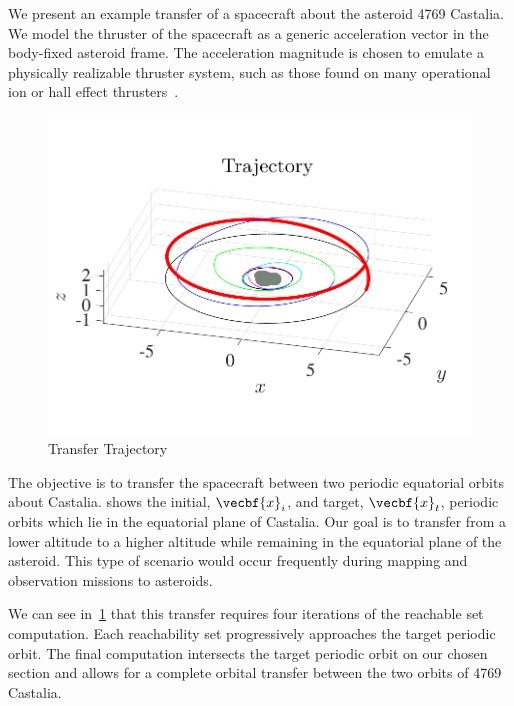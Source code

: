 \documentclass[11pt,reqno]{amsart} %
\begin{document}
\begin{multicols}{2}
We present an example transfer of a spacecraft about the asteroid 4769 Castalia.  
We model the thruster of the spacecraft as a generic acceleration vector in the body-fixed asteroid frame. 
The acceleration magnitude is chosen to emulate a physically realizable thruster system, such as those found on many operational ion or hall effect thrusters~\cite{goebel2008,choueiri2009}.
\begin{figure}[H]
    \includegraphics[width=0.5\columnwidth,height=\columnwidth,keepaspectratio]{figures/trajectory_3d.pdf} 
    \caption{Transfer Trajectory}
    \label{fig:transfer_3d} 
\end{figure}

The objective is to transfer the spacecraft between two periodic equatorial orbits about Castalia.
 shows the initial, \( \vecbf{x}_i \), and target, \( \vecbf{x}_t\), periodic orbits which lie in the equatorial plane of Castalia.
Our goal is to transfer from a lower altitude to a higher altitude while remaining in the equatorial plane of the asteroid.
This type of scenario would occur frequently during mapping and observation missions to asteroids.

We can see in~\cref{fig:transfer_3d} that this transfer requires four iterations of the reachable set computation. 
Each reachability set progressively approaches the target periodic orbit.
The final computation intersects the target periodic orbit on our chosen \Poincare section and allows for a complete orbital transfer between the two orbits of 4769 Castalia.




\end{multicols}
\end{document}
